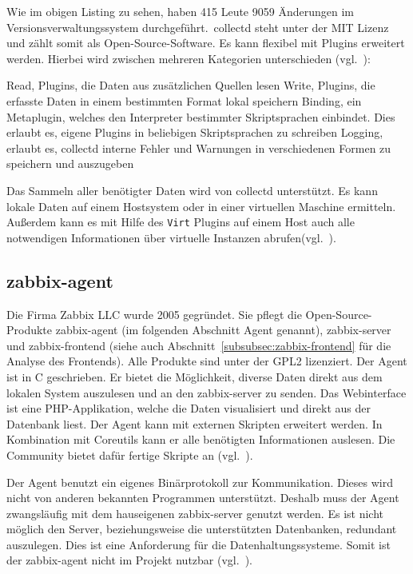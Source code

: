 \begin{center}
    \inputminted{text}{../listings/collectd-clone.txt}
\end{center}

Wie im obigen Listing zu sehen, haben 415 Leute 9059 Änderungen im
Versionsverwaltungssystem durchgeführt.\ collectd steht unter der MIT Lizenz
und zählt somit als Open-Source-Software. Es kann flexibel mit Plugins
erweitert werden. Hierbei wird zwischen mehreren Kategorien
unterschieden (vgl.~\cite{collectd_plugins}):

\begin{outline}
  \1 Read, Plugins, die Daten aus zusätzlichen Quellen lesen
  \1 Write, Plugins, die erfasste Daten in einem bestimmten Format lokal
  speichern
  \1 Binding, ein Metaplugin, welches den Interpreter bestimmter Skriptsprachen
  einbindet. Dies erlaubt es, eigene Plugins in beliebigen Skriptsprachen zu
  schreiben
  \1 Logging, erlaubt es, collectd interne Fehler und Warnungen in verschiedenen
  Formen zu speichern und auszugeben
\end{outline}

Das Sammeln aller benötigter Daten wird von collectd unterstützt. Es kann
lokale Daten auf einem Hostsystem oder in einer virtuellen Maschine ermitteln.
Außerdem kann es mit Hilfe des \texttt{Virt} Plugins auf einem Host auch alle
notwendigen Informationen über virtuelle Instanzen
abrufen(vgl.~\cite{collectd_virt_plugins}).
\tm%

\subsection{zabbix-agent}
Die Firma Zabbix LLC wurde 2005 gegründet. Sie pflegt die Open-Source-Produkte
zabbix-agent (im folgenden Abschnitt Agent genannt), zabbix-server und
zabbix-frontend (siehe auch Abschnitt~\ref{subsubsec:zabbix-frontend} für die
Analyse des Frontends). Alle Produkte sind unter der GPL2 lizenziert. Der Agent
ist in C geschrieben. Er bietet die Möglichkeit, diverse Daten direkt aus dem
lokalen System auszulesen und an den zabbix-server zu senden. Das Webinterface
ist eine PHP-Applikation, welche die Daten visualisiert und direkt aus der
Datenbank liest. Der Agent kann mit externen Skripten erweitert werden. In
Kombination mit Coreutils kann er alle benötigten Informationen auslesen. Die
Community bietet dafür fertige Skripte an (vgl.~\cite{zabbix_virt_plugins}).

Der Agent benutzt ein eigenes Binärprotokoll zur Kommunikation. Dieses wird
nicht von anderen bekannten Programmen unterstützt. Deshalb muss der Agent
zwangsläufig mit dem hauseigenen zabbix-server genutzt werden. Es ist nicht
möglich den Server, beziehungsweise die unterstützten Datenbanken, redundant
auszulegen. Dies ist eine Anforderung für die Datenhaltungssysteme. Somit ist
der zabbix-agent nicht im Projekt nutzbar (vgl.~\cite{zabbix_architecture}).
\tm%

